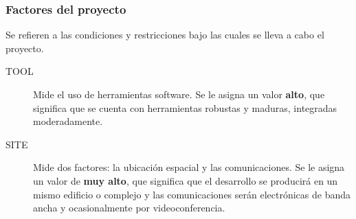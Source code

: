 \documentclass[11pt,a4paper,spanish,twoside]{report}
\begin{document}
\subsubsection{Factores del proyecto}
Se refieren a las condiciones y restricciones bajo las cuales se lleva a cabo
el proyecto.
\begin{description}
\item[TOOL] Mide el uso de herramientas software. Se le asigna un valor
\textbf{alto}, que significa que se cuenta con herramientas robustas y
maduras, integradas moderadamente.
\item[SITE] Mide dos factores: la ubicación espacial y las comunicaciones.
Se le asigna un valor de \textbf{muy alto}, que significa que el desarrollo
se producirá en un mismo edificio o complejo y las comunicaciones serán
electrónicas de banda ancha y ocasionalmente por videoconferencia.
\end{description}
\end{document}
